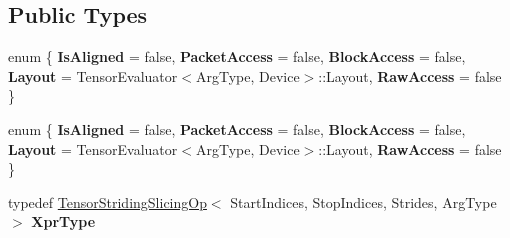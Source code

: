 \subsection*{Public Types}
\begin{DoxyCompactItemize}
\item 
\mbox{\label{struct_eigen_1_1_tensor_evaluator_3_01const_01_tensor_striding_slicing_op_3_01_start_indices_00_cee1ff5835d6d215dedc4ac8d5000be4_afb4290bf683bdccf55a8fb52cdae4219}} 
enum \{ \newline
{\bfseries Is\+Aligned} = false, 
{\bfseries Packet\+Access} = false, 
{\bfseries Block\+Access} = false, 
{\bfseries Layout} = Tensor\+Evaluator$<$Arg\+Type, Device$>$\+:\+:Layout, 
\newline
{\bfseries Raw\+Access} = false
 \}
\item 
\mbox{\label{struct_eigen_1_1_tensor_evaluator_3_01const_01_tensor_striding_slicing_op_3_01_start_indices_00_cee1ff5835d6d215dedc4ac8d5000be4_a5f76514677efa19d5ee932cc20a95c70}} 
enum \{ \newline
{\bfseries Is\+Aligned} = false, 
{\bfseries Packet\+Access} = false, 
{\bfseries Block\+Access} = false, 
{\bfseries Layout} = Tensor\+Evaluator$<$Arg\+Type, Device$>$\+:\+:Layout, 
\newline
{\bfseries Raw\+Access} = false
 \}
\item 
\mbox{\label{struct_eigen_1_1_tensor_evaluator_3_01const_01_tensor_striding_slicing_op_3_01_start_indices_00_cee1ff5835d6d215dedc4ac8d5000be4_a6e7dad9b77d83b5a30d096dd0939c01c}} 
typedef \hyperlink{class_eigen_1_1_tensor_striding_slicing_op}{Tensor\+Striding\+Slicing\+Op}$<$ Start\+Indices, Stop\+Indices, Strides, Arg\+Type $>$ {\bfseries Xpr\+Type}
\item 
\mbox{\label{struct_eigen_1_1_tensor_evaluator_3_01const_01_tensor_striding_slicing_op_3_01_start_indices_00_cee1ff5835d6d215dedc4ac8d5000be4_a7ee2a473e193714d7fc1f6b9a0acee4d}} 

\end{DoxyCompactItemize}
